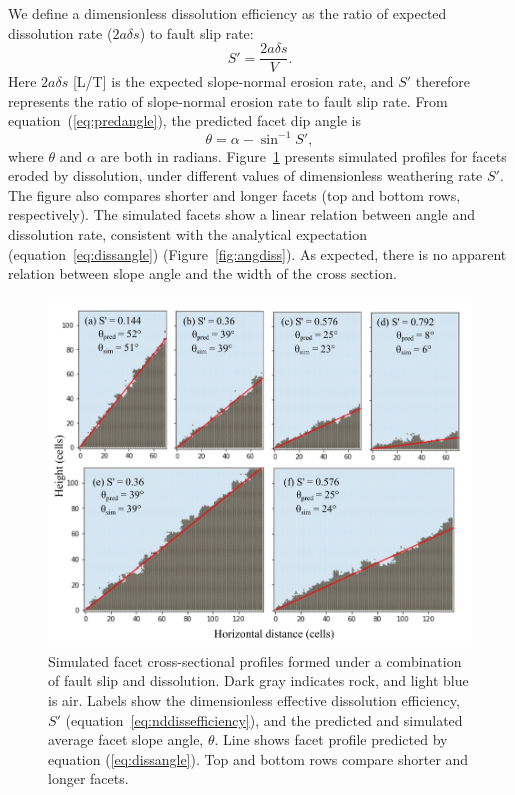 We define a dimensionless dissolution efficiency as the ratio of expected dissolution rate ($2a\delta s$) to fault slip rate:
\begin{equation}
S' = \frac{2a\delta s}{V}.
\label{eq:nddissefficiency}
\end{equation}
Here $2a\delta s$ [L/T] is the expected slope-normal erosion rate, and $S'$ therefore represents the ratio of slope-normal erosion rate to fault slip rate. From equation~(\ref{eq:predangle}), the predicted facet dip angle is
\begin{equation}
\theta = \alpha - \sin^{-1} S',
\label{eq:dissangle}
\end{equation}
where $\theta$ and $\alpha$ are both in radians. Figure~\ref{fig:dissruns} presents simulated profiles for facets eroded by dissolution, under different values of dimensionless weathering rate $S'$. The figure also compares shorter and longer facets (top and bottom rows, respectively). The simulated facets show a linear relation between angle and dissolution rate, consistent with the analytical expectation (equation~\ref{eq:dissangle}) (Figure~\ref{fig:angdiss}). As expected, there is no apparent relation between slope angle and the width of the cross section.

\begin{figure}[ht!]
\centerline{\includegraphics{Figures/dissolution_model_profiles.pdf}}
\caption{Simulated facet cross-sectional profiles formed under a combination of fault slip and dissolution. Dark gray indicates rock, and light blue is air. Labels show the dimensionless effective dissolution efficiency, $S'$ (equation~\ref{eq:nddissefficiency}), and the predicted and simulated average facet slope angle, $\theta$. Line shows facet profile predicted by equation (\ref{eq:dissangle}). Top and bottom rows compare shorter and longer facets.}
\label{fig:dissruns}
\end{figure}

